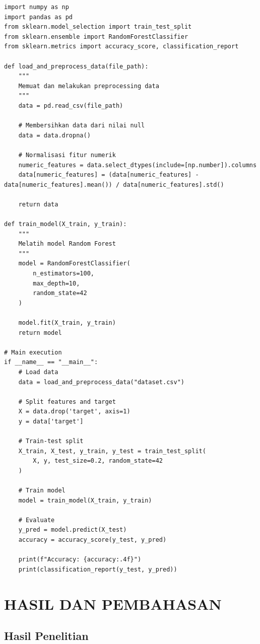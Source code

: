 \documentclass[11pt,a4paper]{article}
\begin{document}
\begin{lstlisting}[caption=Implementasi Algoritma Machine Learning, label=lst:algorithm]
import numpy as np
import pandas as pd
from sklearn.model_selection import train_test_split
from sklearn.ensemble import RandomForestClassifier
from sklearn.metrics import accuracy_score, classification_report

def load_and_preprocess_data(file_path):
    """
    Memuat dan melakukan preprocessing data
    """
    data = pd.read_csv(file_path)

    # Membersihkan data dari nilai null
    data = data.dropna()

    # Normalisasi fitur numerik
    numeric_features = data.select_dtypes(include=[np.number]).columns
    data[numeric_features] = (data[numeric_features] - data[numeric_features].mean()) / data[numeric_features].std()

    return data

def train_model(X_train, y_train):
    """
    Melatih model Random Forest
    """
    model = RandomForestClassifier(
        n_estimators=100,
        max_depth=10,
        random_state=42
    )

    model.fit(X_train, y_train)
    return model

# Main execution
if __name__ == "__main__":
    # Load data
    data = load_and_preprocess_data("dataset.csv")

    # Split features and target
    X = data.drop('target', axis=1)
    y = data['target']

    # Train-test split
    X_train, X_test, y_train, y_test = train_test_split(
        X, y, test_size=0.2, random_state=42
    )

    # Train model
    model = train_model(X_train, y_train)

    # Evaluate
    y_pred = model.predict(X_test)
    accuracy = accuracy_score(y_test, y_pred)

    print(f"Accuracy: {accuracy:.4f}")
    print(classification_report(y_test, y_pred))
\end{lstlisting}

\section{HASIL DAN PEMBAHASAN}

\subsection{Hasil Penelitian}
\lipsum[7]
\end{document}
